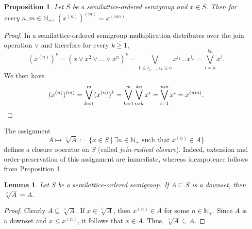 \documentclass[10pt, reqno]{amsart}
\theoremstyle{plain}
\newtheorem{prop}[theorem]{Proposition}
\newtheorem{lemma}[theorem]{Lemma}
\theoremstyle{definition}
\begin{document}
\begin{prop}\label{product_of_powers}
    Let $S$ be a semilattice-ordered semigroup and $x\in S$. Then for every $n, m \in \mathbb{N}_+$, $(x^{(n)})^{(m)} = x^{(nm)}$. 
\end{prop}
\begin{proof}
    In a semilattice-ordered semigroup multiplication distributes over the join operation $\lor$ and therefore for every $k \geqslant 1$,
    \begin{equation*}
        (x^{(n)})^k = (x \lor x^2 \lor \ldots \lor x^n)^k = \displaystyle\bigvee_{1 \leqslant i_1, \ldots, i_k \leqslant n} x^{i_1}\ldots x^{i_k} = \displaystyle\bigvee_{i = k}^{kn} x^i. 
    \end{equation*}
    We then have 
    \begin{equation*}
        (x^{(n)})^{(m)} = \displaystyle\bigvee_{k = 1}^m (x^{(n)})^k = \bigvee_{k = 1}^m\bigvee_{i = k}^{kn} x^i = \bigvee_{i = 1}^{nm} x^i = x^{(nm)}. \qedhere 
    \end{equation*}
\end{proof}
\noindent The assignment 
\begin{equation*}
    A \mapsto \sqrt[\lor]{A} := \{x \in S \mid \exists n\in\mathbb{N}_+ \text{ such that } x^{(n)} \in A\}
\end{equation*}
defines a closure operator on $S$ (called \emph{join-radical closure}). Indeed, extension and order-preservation of this assignment are immediate, whereas idempotence follows from Proposition \ref{product_of_powers}. 
\begin{lemma}\label{join_radical_doesnt_change_downsets}
    Let $S$ be a semilattice-ordered semigroup. If $A\subseteq S$ is a downset, then $\sqrt[\lor]{A} = A$. 
\end{lemma}
\begin{proof}
    Clearly $A \subseteq \sqrt[\lor]{A}$. If $x \in \sqrt[\lor]{A}$, then $x^{(n)} \in A$ for some $n \in \mathbb{N}_+$. Since $A$ is a downset and $x \leqslant x^{(n)}$, it follows that $x \in A$. Thus, $\sqrt[\lor]{A} \subseteq A$.  
\end{proof}
\end{document}
